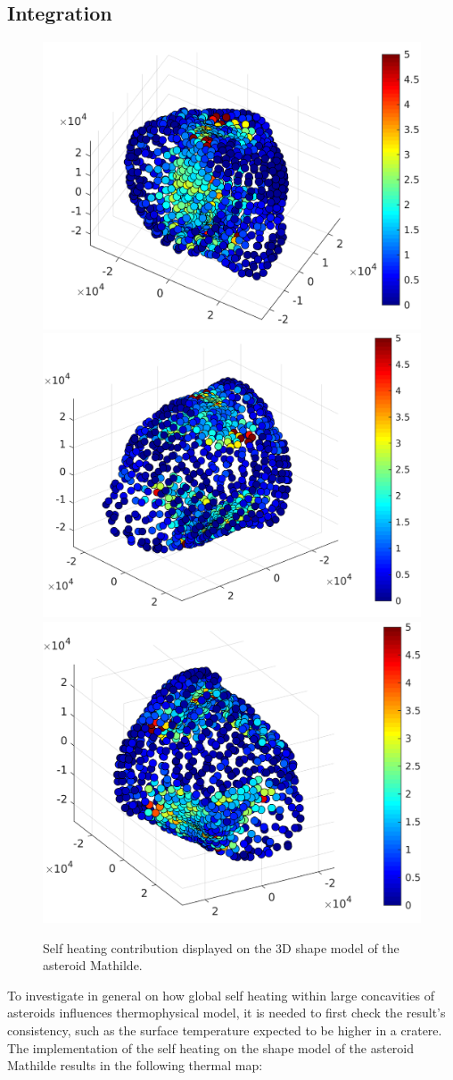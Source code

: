 \subsection{Integration}
\begin{figure}[b]
    \centering
    \includegraphics[width=0.33\linewidth]{rsc/self_3D_1.png}
    \includegraphics[width=0.33\linewidth]{rsc/self_3D_2.png}
    \includegraphics[width=0.33\linewidth]{rsc/self_3D_3.png}
    \caption{Self heating contribution displayed on the 3D shape model of the asteroid Mathilde.}
    \label{fig:5.5}
\end{figure}
To investigate in general on how global self heating within large concavities of asteroids influences thermophysical model, it is needed to first check the result's consistency, such as the surface temperature expected to be higher in a cratere. The implementation of the self heating on the shape model of the asteroid Mathilde results in the following thermal map:
